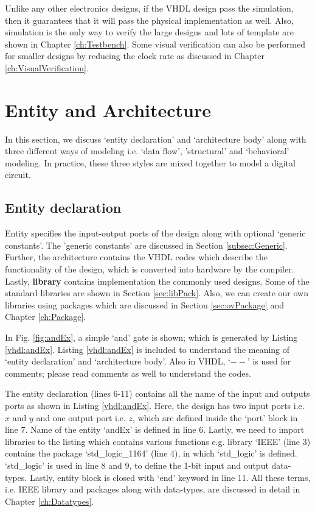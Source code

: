\begin{noNumBox}
	Unlike any other electronics designs, if the VHDL design pass the simulation, then it guarantees that it will pass the physical implementation as well. Also, simulation is the only way to verify the large designs and lots of template are shown in Chapter \ref{ch:Testbench}. Some visual verification can also be performed for smaller designs by reducing the clock rate as discussed in Chapter \ref{ch:VisualVerification}.
\end{noNumBox}


\section{Entity and Architecture}
In this section, we discuss `entity declaration' and `architecture body' along with three different ways of modeling i.e. `data flow', 'structural' and `behavioral' modeling. In practice, these three styles are mixed together to model a digital circuit.  

\subsection{Entity declaration}
Entity specifies the input-output ports of the design along with optional `generic constants'. The 'generic constants' are discussed in Section \ref{subsec:Generic}. Further, the architecture contains the VHDL codes which describe the functionality of the design, which is converted into hardware by the compiler. Lastly, \textbf{library} contains implementation the commonly used designs. Some of the standard libraries are shown in Section \ref{sec:libPack}. Also, we can create our own libraries using packages which are discussed in Section \ref{sec:ovPackage} and Chapter \ref{ch:Package}. 

In Fig. \ref{fig:andEx}, a simple `and' gate is shown; which is generated by Listing \ref{vhdl:andEx}. Listing \ref{vhdl:andEx} is included to understand the meaning of `entity declaration' and `architecture body'. Also in VHDL, `$--$' is used for comments; please read comments as well to understand the codes.

The entity declaration (lines 6-11) contains all the name of the input and outputs ports as shown in Listing \ref{vhdl:andEx}. Here, the design has two input ports i.e. $x$ and $y$ and one output port i.e. $z$, which are defined inside the `port' block in line 7. Name of the entity `andEx' is defined in line 6. Lastly, we need to import libraries to the listing which contains various functions e.g. library `IEEE' (line 3) contains the package `std\_logic\_1164' (line 4), in which `std\_logic' is defined. `std\_logic' is used in line 8 and 9, to define the 1-bit input and output data-types. Lastly, entity block is closed with `end' keyword in line 11. All these terms, i.e. IEEE library and packages along with data-types, are discussed in detail in Chapter \ref{ch:Datatypes}.  

